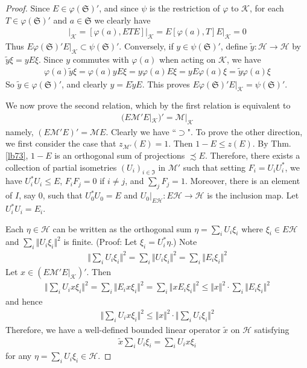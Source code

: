 \documentclass[12pt,b5paper,notitlepage]{article}
\theoremstyle{definition}
\theoremstyle{plain}
\newcommand{\fk}{\mathfrak}
\newcommand{\mc}{\mathcal}
\newcommand{\wtd}{\widetilde}
\numberwithin{equation}{section}
\begin{document}
\begin{proof}
Since $E\in\varphi(\fk S)'$, and since $\psi$ is the restriction of $\varphi$ to $\mc K$, for each $T\in\varphi(\fk S)'$ and $a\in\fk S$ we clearly have
\begin{align*}
[\psi(a),ETE]\big|_{\mc K}=[\varphi(a),ETE]\big|_{\mc K}=E[\varphi(a),T]E\big|_{\mc K}=0
\end{align*}
Thus $E\varphi(\fk S)' E|_{\mc K}\subset\psi(\fk S)'$. Conversely, if $y\in\psi(\fk S)'$, define $\wtd y:\mc H\rightarrow\mc H$ by $\wtd y\xi=yE\xi$. Since $y$ commutes with $\varphi(a)$ when acting on $\mc K$, we have
\begin{align*}
\varphi(a)\wtd y\xi=\varphi(a)yE\xi=y\varphi(a)E\xi=yE\varphi(a)\xi=\wtd y\varphi(a)\xi
\end{align*}
So $\wtd y\in\varphi(\fk S)'$, and clearly $y=E\wtd y E$. This proves $E\varphi(\fk S)' E|_{\mc K}=\psi(\fk S)'$.


We now prove the second relation, which by the first relation is equivalent to
\begin{align}
 \big(E\mc M'E|_{\mc K}\big)'=\mc M|_{\mc K}
\end{align}
namely, $(E\mc M'E)'=\mc ME$. Clearly we have ``$\supset$". To prove the other direction, we first consider the case that $z_{\mc M'}(E)=1$. Then $1-E\leq z(E)$.  By Thm. \ref{lb73}, $1-E$ is an orthogonal sum of projections $\precsim E$. Therefore, there exists  a collection of partial isometries $(U_i)_{i\in\fk I}$ in $\mc M'$ such that setting $F_i=U_iU_i^*$, we have $U_i^*U_i\leq E$, $F_iF_j=0$ if $i\neq j$, and $\sum_j F_j=1$. Moreover, there is an element of $I$, say $0$, such that $U_0^*U_0=E$ and $U_0|_{E\mc H}:E\mc H\rightarrow\mc H$ is the inclusion map. Let $U_i^*U_i=E_i$.


Each $\eta\in\mc H$ can be written as the orthogonal sum $\eta=\sum_i U_i\xi_i$ where $\xi_i\in E\mc H$ and $\sum_i\Vert U_i\xi_i\Vert^2$ is finite. (Proof: Let $\xi_i=U_i^*\eta$.) Note
\begin{align*}
\Big\Vert \sum_i U_i\xi_i \Big\Vert^2=\sum_i\Vert U_i\xi_i\Vert^2=\sum_i \Vert E_i\xi_i\Vert^2
\end{align*}
Let $x\in(E\mc M'E|_{\mc K})'$. Then 
\begin{align*}
\Big\Vert \sum_i U_i x\xi_i \Big\Vert^2=\sum_i \Vert E_i x\xi_i\Vert^2=\sum_i \Vert x E_i \xi_i\Vert^2\leq \Vert x\Vert^2\cdot\sum_i \Vert E_i\xi_i\Vert^2
\end{align*}
and hence
\begin{align*}
\Big\Vert \sum_i U_i x\xi_i \Big\Vert^2\leq \Vert x\Vert^2\cdot\Big\Vert \sum_i U_i\xi_i \Big\Vert^2
\end{align*}
Therefore, we have a well-defined bounded linear operator $\wtd x$ on $\mc H$ satisfying
\begin{align*}
\wtd x\sum_i U_i\xi_i=\sum_i U_ix\xi_i
\end{align*}
for any $\eta=\sum_i U_i\xi_i\in\mc H$.


\end{proof}
\end{document}
